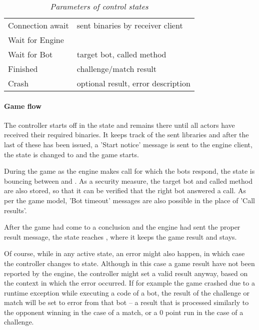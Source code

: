 		\begin{table}[h]
			\centering
			\setlength{\tabcolsep}{8pt}
			\renewcommand{\arraystretch}{1.5}
			\begin{tabularx}{0.8\linewidth}{
				|>{\hsize=0.7\hsize}X|%
				>{\hsize1.3\hsize}X|%
			  }
				\hline
				 \multicolumn{1}{|c|}{\textbf{Control state}} &%
				 \multicolumn{1}{c|}{\textbf{Parameters}} \\ \hline
				
				Connection await & sent binaries by receiver client \\ \hline
				Wait for Engine & \emptycell \\ \hline
				Wait for Bot & target bot, called method \\ \hline
				Finished & challenge/match result \\ \hline
				Crash & optional result, error description \\ \hline
			\end{tabularx}
			\caption*{\emph{Parameters of control states}}
		\end{table}

			\paragraph{Game flow}
			
			The controller starts off in the  state and remains there until all actors have received their required binaries. It keeps track of the sent libraries and after the last of these has been issued, a 'Start notice' message is sent to the engine client, the state is changed to  and the game starts.
			
			During the game as the engine makes call for which the bots respond, the state is bouncing between  and . As a security measure, the target bot and called method are also stored, so that it can be verified that the right bot answered a call. As per the game model, 'Bot timeout' messages are also possible in the place of 'Call results'.
			
			After the game had come to a conclusion and the engine had sent the proper result message, the state reaches , where it keeps the game result and stays.
			
			Of course, while in any active state, an error might also happen, in which case the controller changes to  state. Although in this case a game result have not been reported by the engine, the controller might set a valid result anyway, based on the context in which the error occurred. If for example the game crashed due to a runtime exception while executing a code of a bot, the result of the challenge or match will be set to error from that bot -- a result that is processed similarly to the opponent winning in the case of a match, or a 0 point run in the case of a challenge.

